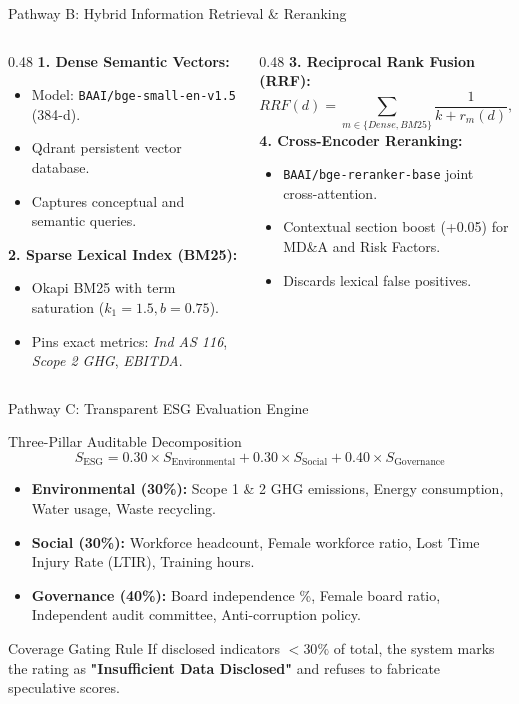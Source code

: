 \documentclass[aspectratio=169,10pt]{beamer}
\begin{document}
\begin{frame}{Pathway B: Hybrid Information Retrieval \& Reranking}
\begin{columns}[T]
\begin{column}{0.48\textwidth}
\textbf{1. Dense Semantic Vectors:}
\begin{itemize}
    \item Model: \texttt{BAAI/bge-small-en-v1.5} (384-d).
    \item Qdrant persistent vector database.
    \item Captures conceptual and semantic queries.
\end{itemize}
\vspace{0.2cm}
\textbf{2. Sparse Lexical Index (BM25):}
\begin{itemize}
    \item Okapi BM25 with term saturation ($k_1=1.5, b=0.75$).
    \item Pins exact metrics: \textit{Ind AS 116}, \textit{Scope 2 GHG}, \textit{EBITDA}.
\end{itemize}
\end{column}
\begin{column}{0.48\textwidth}
\textbf{3. Reciprocal Rank Fusion (RRF):}
$$RRF(d) = \sum_{m \in \{Dense, BM25\}} \frac{1}{k + r_m(d)}, \quad k=60$$
\textbf{4. Cross-Encoder Reranking:}
\begin{itemize}
    \item \texttt{BAAI/bge-reranker-base} joint cross-attention.
    \item Contextual section boost (+0.05) for MD\&A and Risk Factors.
    \item Discards lexical false positives.
\end{itemize}
\end{column}
\end{columns}
\end{frame}

\begin{frame}{Pathway C: Transparent ESG Evaluation Engine}
\begin{block}{Three-Pillar Auditable Decomposition}
$$S_{\text{ESG}} = 0.30 \times S_{\text{Environmental}} + 0.30 \times S_{\text{Social}} + 0.40 \times S_{\text{Governance}}$$
\end{block}
\begin{itemize}
    \item \textbf{Environmental (30\%):} Scope 1 \& 2 GHG emissions, Energy consumption, Water usage, Waste recycling.
    \item \textbf{Social (30\%):} Workforce headcount, Female workforce ratio, Lost Time Injury Rate (LTIR), Training hours.
    \item \textbf{Governance (40\%):} Board independence \%, Female board ratio, Independent audit committee, Anti-corruption policy.
\end{itemize}
\begin{alertblock}{Coverage Gating Rule}
If disclosed indicators $< 30\%$ of total, the system marks the rating as \textbf{"Insufficient Data Disclosed"} and refuses to fabricate speculative scores.
\end{alertblock}
\end{frame}
\end{document}
